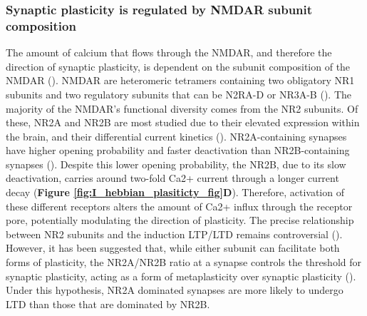\subsubsection{Synaptic plasticity is regulated by NMDAR subunit composition}

The amount of calcium that flows through the NMDAR, and therefore the direction of synaptic plasticity, is  dependent on the subunit composition of the NMDAR (\cite{Yashiro2008RegulationMetaplasticity}). NMDAR are heteromeric tetramers containing two obligatory NR1 subunits and two regulatory subunits that can be N2RA-D or NR3A-B (\cite{Cull-Candy2004RoleSynapses., Al-Hallaq2007NMDAHippocampus}). The majority of the NMDAR’s functional diversity comes from the NR2 subunits. Of these, NR2A and NR2B are most studied due to their elevated expression within the brain, and their differential current kinetics (\cite{Yashiro2008RegulationMetaplasticity}). NR2A-containing synapses have higher opening probability and faster deactivation than NR2B-containing synapses (\cite{Chen1999Subtype-dependenceProbability,Monyer1994DevelopmentalReceptors, Erreger2005Subunit-specificProfiles}). Despite this lower opening probability, the NR2B, due to its slow deactivation, carries around two-fold Ca2+ current through a longer current decay (\textbf{Figure \ref{fig:I_hebbian_plasiticty_fig}D}). Therefore, activation of these different receptors alters the amount of Ca2+ influx through the receptor pore, potentially modulating the direction of plasticity.  The precise relationship between NR2 subunits and the induction LTP/LTD remains controversial (\cite{Liu2004RolePlasticity, Massey2004DifferentialDepression}). However, it has been suggested that, while either subunit can facilitate both forms of plasticity, the NR2A/NR2B ratio at a synapse controls the threshold for synaptic plasticity, acting as a form of metaplasticity over synaptic plasticity (\cite{Philpot2007ObligatoryCortex,Yashiro2008RegulationMetaplasticity}). Under this hypothesis, NR2A dominated synapses are more likely to undergo LTD than those that are dominated by NR2B.

